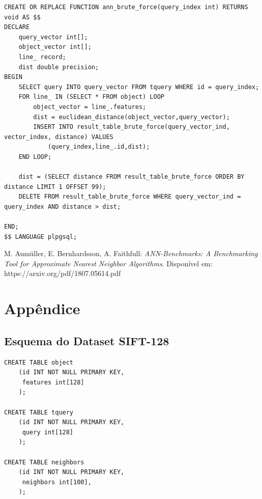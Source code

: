 \documentclass[a4paper,12pt,titlepage]{scrartcl}
\begin{document}
\begin{lstlisting}[caption = O método de força bruta., label = forbru]
CREATE OR REPLACE FUNCTION ann_brute_force(query_index int) RETURNS void AS $$
DECLARE
    query_vector int[];
    object_vector int[];
    line_ record;
    dist double precision;
BEGIN
    SELECT query INTO query_vector FROM tquery WHERE id = query_index;
    FOR line_ IN (SELECT * FROM object) LOOP
        object_vector = line_.features;
        dist = euclidean_distance(object_vector,query_vector);
        INSERT INTO result_table_brute_force(query_vector_ind, vector_index, distance) VALUES
            (query_index,line_.id,dist);
    END LOOP;

    dist = (SELECT distance FROM result_table_brute_force ORDER BY distance LIMIT 1 OFFSET 99);
    DELETE FROM result_table_brute_force WHERE query_vector_ind = query_index AND distance > dist;

END;
$$ LANGUAGE plpgsql;

\end{lstlisting}
\vspace{5mm}



\begin{thebibliography}{99}

 M. Aum\"{u}ller, E. Bernhardsson, A. Faithfull: \emph{ANN-Benchmarks: A Benchmarking Tool for Approximate Nearest Neighbor Algorithms}. Disponível em: https://arxiv.org/pdf/1807.05614.pdf


\end{thebibliography}

\appendix


\section{Appêndice}

\subsection{Esquema do Dataset SIFT-128}\label{app-1}
\begin{lstlisting}[caption = O esquema do pré-processamento, label = esqmet0]
CREATE TABLE object
	(id INT NOT NULL PRIMARY KEY,
	 features int[128]
	);

CREATE TABLE tquery
	(id INT NOT NULL PRIMARY KEY,
	 query int[128]
	);

CREATE TABLE neighbors
	(id INT NOT NULL PRIMARY KEY,
	 neighbors int[100],
	);

\end{lstlisting}
\vspace{5mm}
\end{document}
